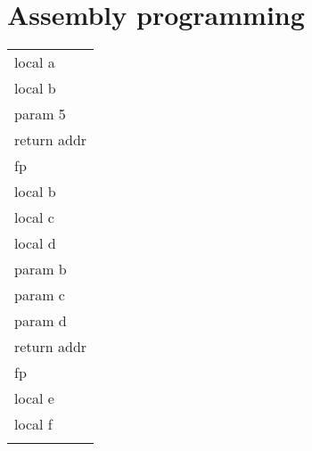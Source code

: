 \section{Assembly programming}
\begin{tabular}{|l|}
\\
\hline
local a \\
local b \\
\hline
param 5 \\
\hline
return addr \\
\hline
fp	\\
\hline
local b	\\
local c	\\
local d	\\
\hline
param b	\\
param c	\\
param d	\\
\hline
return addr \\
\hline
fp	\\
\hline
local e	\\
local f	\\

\hline
\\
\end{tabular}
